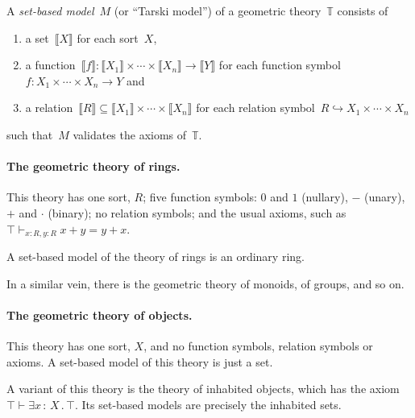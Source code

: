 \documentclass{ws-rv9x6}
\newcommand{\TT}{\mathbb{T}}
\renewcommand{\_}{\mathpunct{.}}
\newcommand{\?}{\,{:}\,}
\newcommand{\brak}[1]{{\llbracket{#1}\rrbracket}}
\begin{document}
\begin{definition}A \emph{set-based model}~$M$ (or ``Tarski model'') of a
geometric theory~$\TT$ consists of
\begin{enumerate}
  \item a set~$\brak{X}$ for each sort~$X$,
  \item a function~$\brak{f} : \brak{X_1} \times \cdots \times \brak{X_n} \to
  \brak{Y}$
  for each function symbol~$f : X_1 \times \cdots \times X_n \to Y$ and
  \item a relation~$\brak{R} \subseteq \brak{X_1} \times \cdots \times \brak{X_n}$
  for each relation symbol~$R \hookrightarrow X_1 \times \cdots \times X_n$
\end{enumerate}
such that~$M$ validates the axioms of~$\TT$.
\end{definition}

\paragraph{The geometric theory of rings.} This theory has one sort, $R$; five function symbols:
$0$ and $1$ (nullary), $-$ (unary), $+$ and $\cdot$ (binary); no relation
symbols; and the usual axioms, such as $\top \vdash_{x:R,y:R} x + y = y + x$.

A set-based model of the theory of rings is an ordinary ring.

In a similar vein, there is the geometric theory of monoids, of groups, and so
on.

\paragraph{The geometric theory of objects.} This theory has one sort, $X$, and no function
symbols, relation symbols or axioms. A set-based model of this theory is just a
set.

A variant of this theory is the theory of inhabited objects, which has the
axiom~$\top \vdash \exists x\?X\_ \top$. Its set-based models are precisely the
inhabited sets.
\end{document}
